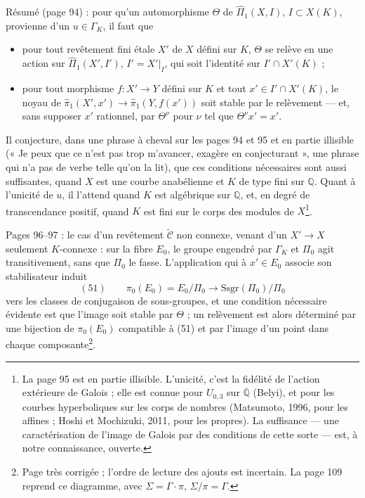 \documentclass[11pt,a4paper]{article}
\begin{document}
Résumé (page 94) : pour qu'un automorphisme $\Theta$ de $\widehat\Pi_1(X, I)$,
$I \subset X(K)$, provienne d'un $u \in \Gamma_K$, il faut que
\begin{itemize}
\item[a)] pour tout revêtement fini étale $X'$ de $X$ défini sur $K$, $\Theta$
se relève en une action sur $\widehat\Pi_1(X', I')$, $I' = X'|_I$, qui soit
l'identité sur $I' \cap X'(K)$ ;
\item[b)] pour tout morphisme $f : X' \to Y$ défini sur $K$ et tout $x' \in
I' \cap X'(K)$, le noyau de $\widehat\pi_1(X', x') \to \widehat\pi_1(Y, f(x'))$
soit stable par le relèvement — et, sans supposer $x'$ rationnel, par
$\Theta^{\nu}$ pour $\nu$ tel que $\Theta^{\nu}x' = x'$.
\end{itemize}
Il conjecture, dans une phrase à cheval sur les pages 94 et 95 et en partie
illisible (« Je peux que ce n'est pas trop m'avancer, exagère en conjecturant », une phrase
qui n'a pas de verbe telle qu'on la lit), que
ces conditions nécessaires sont aussi suffisantes, quand $X$ est une courbe anabélienne et
$K$ de type fini sur $\mathbb{Q}$. Quant à l'unicité de $u$, il l'attend quand
$K$ est algébrique sur $\mathbb{Q}$, et, en degré de transcendance positif,
quand $K$ est fini sur le corps des modules de $X$\footnote{La page 95 est en
partie illisible. L'unicité, c'est la fidélité de l'action extérieure de
Galois ; elle est connue pour $U_{0,3}$ sur $\overline{\mathbb{Q}}$ (Belyi),
et pour les courbes hyperboliques sur les corps de nombres (Matsumoto, 1996,
pour les affines ; Hoshi et Mochizuki, 2011, pour les propres). La suffisance
— une caractérisation de l'image de Galois par des conditions de cette sorte
— est, à notre connaissance, ouverte.}.

Pages 96–97 : le cas d'un revêtement $\widetilde{\mathcal{C}}$ non connexe,
venant d'un $X' \to X$ seulement $K$-connexe : sur la fibre $E_0$, le groupe
engendré par $\Gamma_K$ et $\Pi_0$ agit transitivement, sans que $\Pi_0$ le
fasse. L'application qui à $x' \in E_0$ associe son stabilisateur induit
\[
(51)\qquad \pi_0(E_0) = E_0/\Pi_0 \longrightarrow \mathrm{Ssgr}(\Pi_0)/\Pi_0
\]
vers les classes de conjugaison de sous-groupes, et une condition nécessaire
évidente est que l'image soit stable par $\Theta$ ; un relèvement est alors
déterminé par une bijection de $\pi_0(E_0)$ compatible à (51) et par l'image
d'un point dans chaque composante\footnote{Page très corrigée ; l'ordre de
lecture des ajouts est incertain. La page 109 reprend ce diagramme, avec
$\Sigma = \Gamma \cdot \pi$, $\Sigma/\pi = \Gamma$.}.
\end{document}
